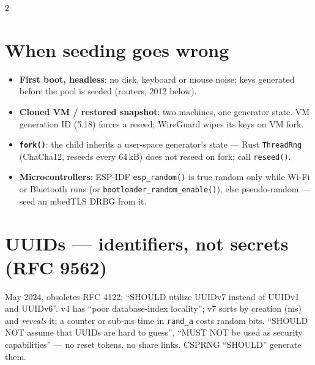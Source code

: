 \documentclass[8pt]{extarticle}
\newcommand\ct[1]{\texttt{#1}}
\begin{document}
\begin{multicols}{2}
\section{When seeding goes wrong}
\begin{itemize}
  \item \textbf{First boot, headless}: no disk, keyboard or mouse noise; keys generated before the
        pool is seeded (routers, 2012 below).
  \item \textbf{Cloned VM / restored snapshot}: two machines, one generator state. VM generation ID
        (5.18) forces a reseed; WireGuard wipes its keys on VM fork.
  \item \textbf{\ct{fork()}}: the child inherits a user-space generator's state — Rust
        \ct{ThreadRng} (ChaCha12, reseeds every 64\,kB) does not reseed on fork; call \ct{reseed()}.
  \item \textbf{Microcontrollers}: ESP-IDF \ct{esp\_random()} is true random only while Wi-Fi or
        Bluetooth runs (or \ct{bootloader\_random\_enable()}), else pseudo-random — seed an mbedTLS
        DRBG from it.
\end{itemize}

\section{UUIDs — identifiers, not secrets (RFC 9562)}
\par
May 2024, obsoletes RFC 4122; ``SHOULD utilize UUIDv7 instead of UUIDv1 and UUIDv6''. v4 has ``poor
database-index locality''; v7 sorts by creation (ms) and \emph{reveals} it; a counter or sub-ms time
in \ct{rand\_a} costs random bits. ``SHOULD NOT assume that UUIDs are hard to guess'', ``MUST NOT be
used as security capabilities'' — no reset tokens, no share links. CSPRNG ``SHOULD'' generate them.


\end{multicols}
\end{document}
